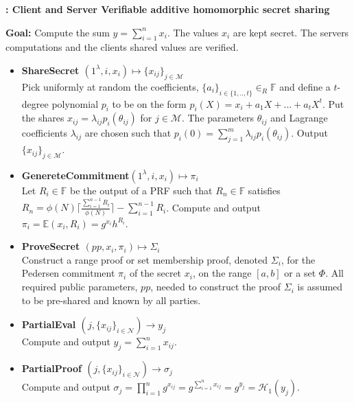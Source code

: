 \begin{algorithm}
\caption{\textbf{: Client and Server Verifiable additive homomorphic secret sharing}}

\textbf{Goal:} Compute the sum $y = \sum_{i=1}^n x_i$. The values $x_i$ are kept secret. The servers computations and the clients shared values are verified. 
\vspace{2pt}
\hline
\vspace{2pt}
\begin{itemize}
 \item\textbf{ShareSecret $(1^\lambda,i,x_i) \mapsto \{x_{ij}\}_{j\in\mathcal{M}}$} \\
Pick uniformly at random the coefficients, $\{a_i\}_{i\in\{1,..,t\}}\in_R\mathds{F}$ and define a $t$-degree polynomial $p_i$ to be on the form $p_i(X) = x_i + a_1X+...+a_tX^t$. Put the shares $x_{ij}=\lambda_{ij}p_i(\theta_{ij})$ for $j\in\mathcal{M}$.  The parameters $\theta_{ij}$ and Lagrange coefficients $\lambda_{ij}$ are chosen such that $ p_i(0) = \sum_{j=1}^m \lambda_{ij}p_i(\theta_{ij})$.
Output $\{x_{ij}\}_{j\in\mathcal{M}}$.

\item\textbf{GenereteCommitment$(1^\lambda,i,x_i) \mapsto \pi_i$ }\\
Let $R_i\in\mathds{F}$ be the output of a PRF such that $R_n\in \mathds{F}$  satisfies $R_n = \phi(N)\lceil \frac{\sum_{i=1}^{n-1}R_i}{\phi(N)}\rceil- \sum_{i=1}^{n-1}R_i $. Compute and output $\pi_i = \mathds{E}(x_i,R_i)= g^{x_i}h^{R_i}$.

\item\textbf{ProveSecret $(pp,x_i,\pi_i) \mapsto \Sigma_i$}\\
Construct a range proof or set membership proof, denoted $\Sigma_i$, for the Pedersen commitment $\pi_i$ of the secret $x_i$, on the  range $[a,b]$ or a set $\Phi$. All required public parameters, $pp$, needed to  construct the proof $\Sigma_i$ is assumed to be pre-shared and known by all parties.
\item\textbf{PartialEval $(j,\{x_{ij}\}_{i\in\mathcal{N}})\xrightarrow[]{}y_j$}\\
Compute and output $y_j = \sum_{i=1}^n x_{ij}$.

\item\textbf{PartialProof $(j,\{x_{ij}\}_{i\in\mathcal{N}})\xrightarrow[]{}\sigma_j$}\\
Compute and output $\sigma_j = \prod_{i=1}^n g^{x_{ij}} =  g^{\sum_{i=1}^n x_{ij}}= g^{y_j}=\mathcal{H}_1(y_j)$.


\end{itemize}
\end{algorithm}
